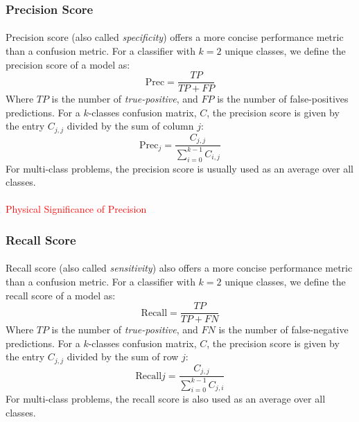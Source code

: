 \documentclass[12pt,letterpaper]{article}
\begin{document}

\subsubsection{Precision Score}

\paragraph*{}Precision score (also called \textit{specificity}) offers a more concise performance metric than a confusion metric. For a classifier with $k = 2$ unique classes, we define the precision score of a model as:
\begin{equation}
\label{eqn-BinaryPrecision}
\text{Prec} = \frac{TP}{TP + FP}
\end{equation}
Where $TP$ is the number of \textit{true-positive}, and $FP$ is the number of false-positives predictions. For a $k$-classes confusion matrix, $C$, the precision score is given by the entry $C_{j,j}$ divided by the sum of column $j$:
\begin{equation}
\label{eqn-KPrecision}
\text{Prec}_j = \frac{C_{j,j}}{\sum_{i=0}^{k-1}C_{i,j}}
\end{equation}
For multi-class problems, the precision score is usually used as an average over all classes. 

\paragraph*{}
\textcolor{red}{Physical Significance of Precision}


\subsubsection{Recall Score}

\paragraph*{}Recall score (also called \textit{sensitivity}) also offers a more concise performance metric than a confusion metric. For a classifier with $k = 2$ unique classes, we define the recall score of a model as:
\begin{equation}
\label{eqn-BinaryRecall}
\text{Recall} = \frac{TP}{TP + FN}
\end{equation}
Where $TP$ is the number of \textit{true-positive}, and $FN$ is the number of false-negative predictions. For a $k$-classes confusion matrix, $C$, the precision score is given by the entry $C_{j,j}$ divided by the sum of row $j$:
\begin{equation}
\label{eqn-KRecall}
\text{Recall}j = \frac{C_{j,j}}{\sum_{i=0}^{k-1}C_{j,i}}
\end{equation}
For multi-class problems, the recall score is also used as an average over all classes. 
\end{document}
